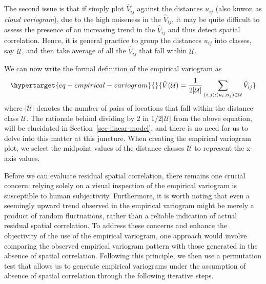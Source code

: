 \documentclass[
  letterpaper,
]{krantz}
\begin{document}
The second issue is that if simply plot \(\hat{V}_{ij}\) against the
distances \(u_{ij}\) (also knwon as \emph{cloud variogram}), due to the
high noiseness in the \(\hat{V}_{ij}\), it may be quite difficult to
assess the presence of an increasing trend in the \(\hat{V}_{ij}\) and
thus detect spatial correlation. Hence, it is general practice to group
the distances \(u_{ij}\) into classes, say \(\mathcal{U}\), and then
take average of all the \(\hat{V}_{ij}\) that fall within
\(\mathcal{U}\).

We can now write the formal definition of the empirical variogram as
\begin{equation}\protect\hypertarget{eq-empirical-variogram}{}{
\hat{V}(\mathcal{U}) = \frac{1}{2 |\mathcal{U}|} \sum_{(i, j): (u_i, u_j) \in \mathcal{U}} \hat{V}_{ij}
}\label{eq-empirical-variogram}\end{equation} where \(|\mathcal{U}|\)
denotes the number of pairs of locations that fall within the distance
class \(\mathcal{U}\). The rationale behind dividing by 2 in
\(1/2 |\mathcal{U}|\) from the above equation, will be elucidated in
Section~\ref{sec-linear-model}, and there is no need for us to delve
into this matter at this juncture. When creating the empirical variogram
plot, we select the midpoint values of the distance classes
\(\mathcal{U}\) to represent the x-axis values.

Before we can evaluate residual spatial correlation, there remains one
crucial concern: relying solely on a visual inspection of the empirical
variogram is susceptible to human subjectivity. Furthermore, it is worth
noting that even a seemingly upward trend observed in the empirical
variogram might be merely a product of random fluctuations, rather than
a reliable indication of actual residual spatial correlation. To address
these concerns and enhance the objectivity of the use of the empirical
variogram, one approach would involve comparing the observed empirical
variogram pattern with those generated in the absence of spatial
correlation. Following this principle, we then use a permutation test
that allows us to generate empirical variograms under the assumption of
absence of spatial correlation through the following iterative steps.
\end{document}
